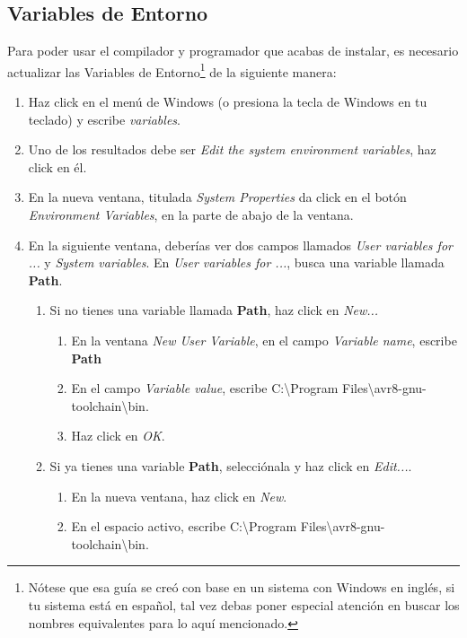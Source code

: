 \documentclass[10pt,letterpaper]{article}
\begin{document}
\subsection{Variables de Entorno}
Para poder usar el compilador y programador que acabas de instalar, es necesario actualizar las Variables de Entorno\footnote{Nótese que esa guía se creó con base en un sistema con Windows en inglés, si tu sistema está en español, tal vez debas poner especial atención en buscar los nombres equivalentes para lo aquí mencionado.} de la siguiente manera:
\begin{enumerate}
    \item Haz click en el menú de Windows (o presiona la tecla de Windows en tu teclado) y escribe \textit{variables}.
    \item Uno de los resultados debe ser \textit{Edit the system environment variables}, haz click en él.
    \item En la nueva ventana, titulada \textit{System Properties} da click en el botón \textit{Environment Variables}, en la parte de abajo de la ventana.
    \item En la siguiente ventana, deberías ver dos campos llamados \textit{User variables for ...} y \textit{System variables}. En \textit{User variables for ...}, busca una variable llamada \textbf{Path}.
    \begin{enumerate}
        \item Si no tienes una variable llamada \textbf{Path}, haz click en \textit{New...} 
        \begin{enumerate}
            \item En la ventana \textit{New User Variable}, en el campo \textit{Variable name}, escribe \textbf{Path}
            \item En el campo \textit{Variable value}, escribe {\color{ForestGreen}C:\textbackslash Program Files\textbackslash avr8-gnu-toolchain\textbackslash bin}.
            \item Haz click en \textit{OK}.
        \end{enumerate}
        \item Si ya tienes una variable \textbf{Path}, selecciónala y haz click en \textit{Edit...}. 
        \begin{enumerate}
            \item En la nueva ventana, haz click en \textit{New}.
            \item En el espacio activo, escribe {\color{ForestGreen}C:\textbackslash Program Files\textbackslash avr8-gnu-toolchain\textbackslash bin}.

\end{enumerate}
\end{enumerate}
\end{enumerate}
\end{document}
